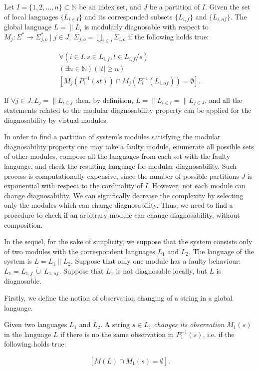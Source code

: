 \documentclass[a4paper, 10pt, conference]{ieeeconf}
\begin{document}
\begin{definition} 
Let $I = \{1,2,\ldots,n\} \subset  \mathbb{N}$ be an index set, and $J$ be a
partition of $I$. Given the set of local languages $\{L_{i \in I}\}$ and its
corresponded subsets $\{L_{i,f}\}$ and $\{L_{i,nf}\}$. The global language $L =
\parallel L_i$ is modularly diagnosable with respect to
$M_j: \Sigma^* \rightarrow \Sigma_{j,o}^* 
\mid j \in J, ~\Sigma_{j,o} =\bigcup_{i \in j} \Sigma_{i,o}$ 
if the following holds true:
\end{definition}
\begin{equation}
\begin{array}{l}
	\forall(i \in I, s \in L_{i,f}, t \in L_{i,f}/s)
	\\
	(\exists n \in \mathbb{N})
	(|t| \geq n)
	\\
	\left[ M_j(P_i^{-1}(st)) \cap M_j(P_i^{-1}(L_{i,nf})) = \emptyset \right].
\end{array}
\end{equation}

If $\forall j \in J, L_{j} = \parallel L_{i \in j}$ then, by definition, $L =
\parallel L_{i \in I} = \parallel L_{j \in J}$, and all the statements related
to the modular diagnosability  property can be applied for the diagnosability by
virtual modules.

In order to find a partition of system's modules satisfying the modular
diagnosability property one may take a faulty module, enumerate all possible
sets of other modules, compose all the languages from each set with the faulty
language, and check the resulting language for modular diagnosability.
Such process is computationally expensive, since the number of possible
partitions $J$ is exponential with respect to the cardinality of $I$. However,
not each module can change diagnosability. We can significally decrease the
complexity by selecting only the modules which can change diagnosability. Thus,
we need to find a procedure to check if an arbitrary module can change
diagnosability, without composition.

In the sequel, for the sake of simplicity, we suppose that the system consists
only of two modules with the correspondent languages $L_1$ and $L_2$. The
language of the system is $L = L_1 \parallel L_2$. Suppose that only one module
has a faulty behaviour: $L_1 = L_{1,f} ~\dot{\cup}~ L_{1,nf}$.
Suppose that $L_1$ is not diagnosable locally, but $L$ is diagnosable.

Firstly, we define the notion of observation changing of a string in a global
language.
\begin{definition}Given two languages $L_1$ and $L_2$. A string $s \in
L_1$ \emph{changes its observation} $M_1(s)$ in the language $L$ if
there is no the same observation in $P_1^{-1}(s)$, i.e.
if the following holds true:
\end{definition}
\begin{equation}
\label{def:obs}
\begin{array}{l}
	\left[ M(L) \cap M_1(s) = \emptyset \right].
\end{array}
\end{equation}
\end{document}
